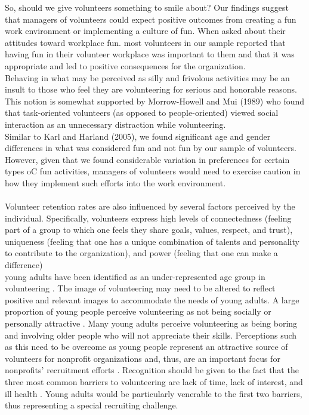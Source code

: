 \documentclass[11pt,fleqn]{book} %
\begin{document}
So, should we give volunteers something to smile about? Our
findings suggest that managers of volunteers could expect positive
outcomes from creating a fun work environment or implementing a
culture of fun. When asked about their attitudes toward workplace
fun. most volunteers in our sample reported that having fun in their
volunteer workplace was important to them and that it was
appropriate and led to positive consequences for the organization.\\

Behaving in what may be perceived as silly and
frivolous activities may be an insult to those who feel they are
volunteering for serious and honorable reasons. This notion is
somewhat supported by Morrow-Howell and Mui (1989) who found
that task-oriented volunteers (as opposed to people-oriented) viewed
social interaction as an unnecessary distraction while volunteering.\\

Similar to Karl and Harland (2005), we found significant age and
gender differences in what was considered fun and not fun by our
sample of volunteers.\\

However, given that we found
considerable variation in preferences for certain types oC fun
activities, managers of volunteers would need to exercise caution in
how they implement such efforts into the work environment.\\








\autocite{shields_young_2009}\\
Volunteer retention rates are also influenced by several factors perceived by the individual. Specifically, volunteers express high levels of connectedness (feeling part of a group to which one feels they share goals, values, respect, and trust), uniqueness (feeling that one has a unique combination of talents and personality to contribute to the organization), and power (feeling that one can make a difference)\\

young adults have been identified as an under-represented
age group in volunteering . The image of
volunteering may need to be altered to reflect positive and relevant images
to accommodate the needs of young adults. A large proportion of young
people perceive volunteering as not being socially or personally attractive
. Many young adults perceive volunteering as
being boring and involving older people who will not appreciate their skills.
Perceptions such as this need to be overcome as young people represent an
attractive source of volunteers for nonprofit organizations and, thus, are an
important focus for nonprofits’ recruitment efforts . Recognition should be given to the fact that the three most
common barriers to volunteering are lack of time, lack of interest, and ill
health . Young adults would be
particularly venerable to the first two barriers, thus representing a special
recruiting challenge. \\
\end{document}
